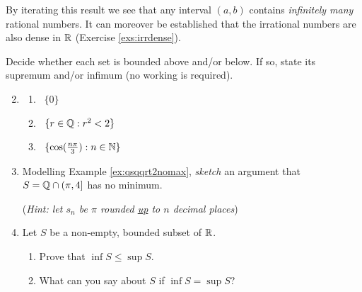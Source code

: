 
By iterating this result we see that any interval $(a,b)$ contains \emph{infinitely many} rational numbers. It can moreover be established that the irrational numbers are also dense in $\mathbb{R}$ (Exercise \ref{exs:irrdense}).

\bigbreak



\begin{exercises}{}{}
	\exstart %
	Decide whether each set is bounded above and/or below. If so, state its supremum and/or infimum (no working is required).
	\begin{enumerate}\setcounter{enumi}{1}
	  \item[]\begin{enumerate}
	    \item {}  \ $\{0\}$
	    \setcounter{enumii}{3}
	    \item {}  \ $\{r\in\mathbb{Q}:r^2<2\}$
	    \setcounter{enumii}{6}
	    \item {}  \ $\{\cos(\frac{n\pi}3):n\in\mathbb{N}\}$
  \end{enumerate}

  
  	\item Modelling Example \ref{ex:qsqqrt2nomax}, \emph{sketch} an argument that $S=\mathbb{Q}\cap (\pi,4]$ has no minimum.\par
  	(\emph{Hint: let $s_n$ be $\pi$ rounded \underline{up} to $n$ decimal places})
  
  
		\item %
		Let $S$ be a non-empty, bounded subset of $\mathbb{R}$.
  	\begin{enumerate}
		  \item Prove that $\inf S\le \sup S$. %
		  \item What can you say about $S$ if $\inf S=\sup S$?
  	\end{enumerate}
  
  
  	\goodbreak
  

\end{enumerate}
\end{exercises}

